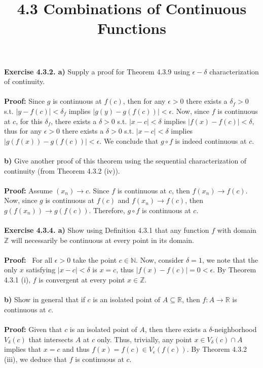 \documentclass{article}
\title{\textbf{4.3 Combinations of Continuous Functions}}
\begin{document}
	\maketitle
	\textbf{Exercise 4.3.2. a)} Supply a proof for Theorem 4.3.9 using $\epsilon-\delta$ characterization of continuity. \\ \\
	\textbf{Proof:} Since $g$ is continuous at $f(c)$, then for any $\epsilon > 0$ there exists a $\delta_f > 0$ s.t. $|y - f(c)| < \delta_f$ implies $|g(y) - g(f(c))| < \epsilon$. Now, since $f$ is continuous at $c$, for this $\delta_f$, there exists a $\delta > 0$ s.t. $|x - c| < \delta$ implies $|f(x) - f(c)| < \delta$, thus for any $\epsilon > 0$ there exists a $\delta > 0$ s.t. $|x - c| < \delta$ implies $|g(f(x)) - g(f(c))| < \epsilon$. We conclude that $g \circ f$ is indeed continuous at $c$. \\ \\
	\textbf{b)} Give another proof of this theorem using the sequential characterization of continuity (from Theorem 4.3.2 (iv)). \\ \\
	\textbf{Proof:} Assume $(x_n) \to c$. Since $f$ is continuous at $c$, then $f(x_n) \to f(c)$. Now, since $g$ is continuous at $f(c)$ and $f(x_n) \to f(c)$, then $g(f(x_n)) \to g(f(c))$. Therefore, $g \circ f$ is continuous at $c$. \\ \\
	\textbf{Exercise 4.3.4. a)} Show using Definition 4.3.1 that any function $f$ with domain $\mathbb{Z}$ will necessarily be continuous at every point in its domain. \\ \\
	\textbf{Proof:} \ For all $\epsilon > 0$ take the point $c \in \mathbb{N}$. Now, consider $\delta = 1$, we note that the only $x$ satisfying $|x - c| < \delta$ is $x = c$, thus $|f(x) - f(c)| = 0 < \epsilon$. By Theorem 4.3.1 (i), $f$ is convergent at every point $x \in \mathbb{Z}$. \\ \\
	\textbf{b)} Show in general that if $c$ is an isolated point of $A \subseteq \mathbb{R}$, then $f : A \to \mathbb{R}$ is continuous at $c$. \\ \\
	\textbf{Proof:} Given that $c$ is an isolated point of $A$, then there exists a $\delta$-neighborhood $V_{\delta}(c)$ that intersects $A$ at $c$ only. Thus, trivially, any point $x \in V_{\delta}(c) \cap A$ implies that $x = c$ and thus $f(x) = f(c) \in V_{\epsilon}(f(c))$. By Theorem 4.3.2 (iii), we deduce that $f$ is continuous at $c$. \\ \\
\end{document}
